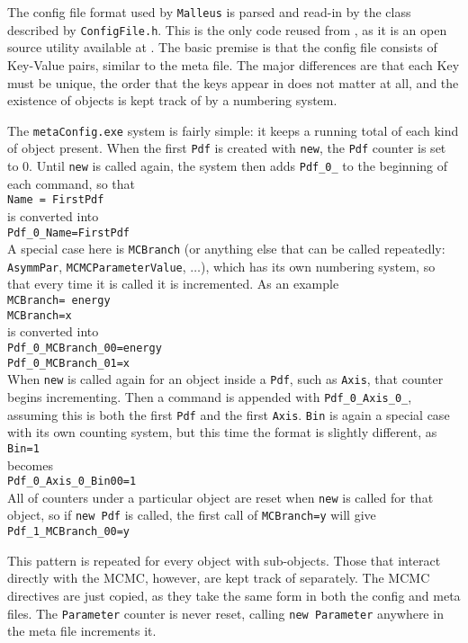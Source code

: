 The config file format used by \verb|Malleus| is parsed and read-in by
the class described by \verb|ConfigFile.h|.  This is the only code
reused from \cite{BlairNCD}, as it is an open source utility available
at \cite{ConfigFileSite}.  The basic premise is that the config file
consists of Key-Value pairs, similar to the meta file.  The major
differences are that each Key must be unique, the order that the keys
appear in does not matter at all, and the existence of objects is kept
track of by a numbering system.

The {\tt metaConfig.exe} system is fairly simple: it keeps a running
total of each kind of object present.  When the first {\tt Pdf} is
created with {\tt new}, the {\tt Pdf} counter is set to $0$.  Until
{\tt new} is called again, the system then adds {\tt Pdf\_0\_} to the
beginning of each command, so that\\
{\tt Name = FirstPdf}\\
is converted into\\
{\tt Pdf\_0\_Name=FirstPdf}\\
A special case here is {\tt MCBranch} (or anything else that can be
called repeatedly: {\tt AsymmPar}, {\tt MCMCParameterValue},
$\ldots$), which has its own numbering system, so that every time it
is called it is incremented.  As an
example\\
{\tt MCBranch= energy}\\
{\tt MCBranch=x}\\
is converted into\\
{\tt Pdf\_0\_MCBranch\_00=energy}\\
{\tt Pdf\_0\_MCBranch\_01=x}\\
When {\tt new} is called again for an object inside a {\tt Pdf}, such
as {\tt Axis}, that counter begins incrementing.  Then a command is
appended with {\tt Pdf\_0\_Axis\_0\_}, assuming this is both the first
{\tt Pdf} and the first {\tt Axis}.  {\tt Bin} is again a special case
with its own counting system, but this time the format is slightly
different, as\\
{\tt Bin=1}\\
becomes\\
{\tt Pdf\_0\_Axis\_0\_Bin00=1}\\
All of counters under a particular object are reset when {\tt new} is
called for that object, so if {\tt new Pdf} is called, the first call
of {\tt MCBranch=y} will give\\
{\tt Pdf\_1\_MCBranch\_00=y}

This pattern is repeated for every object with sub-objects.  Those
that interact directly with the MCMC, however, are kept track of
separately.  The MCMC directives are just copied, as they take the
same form in both the config and meta files.  The {\tt Parameter}
counter is never reset, calling {\tt new Parameter} anywhere in the
meta file increments it.

